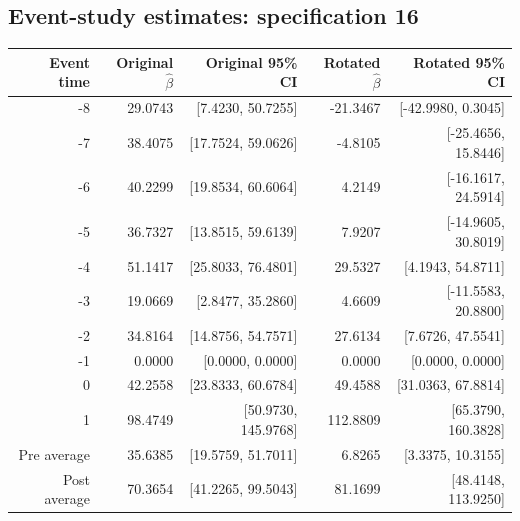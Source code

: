\documentclass[10pt]{article}
\begin{document}
\subsection*{Event-study estimates: specification 16}
\begin{center}\scriptsize
\begin{tabular}{r rr rr}
\toprule
Event time & Original $\hat\beta$ & Original 95\% CI & Rotated $\hat\beta$ & Rotated 95\% CI \\
\midrule
-8 & 29.0743 & [7.4230, 50.7255] & -21.3467 & [-42.9980, 0.3045] \\
-7 & 38.4075 & [17.7524, 59.0626] & -4.8105 & [-25.4656, 15.8446] \\
-6 & 40.2299 & [19.8534, 60.6064] & 4.2149 & [-16.1617, 24.5914] \\
-5 & 36.7327 & [13.8515, 59.6139] & 7.9207 & [-14.9605, 30.8019] \\
-4 & 51.1417 & [25.8033, 76.4801] & 29.5327 & [4.1943, 54.8711] \\
-3 & 19.0669 & [2.8477, 35.2860] & 4.6609 & [-11.5583, 20.8800] \\
-2 & 34.8164 & [14.8756, 54.7571] & 27.6134 & [7.6726, 47.5541] \\
-1 & 0.0000 & [0.0000, 0.0000] & 0.0000 & [0.0000, 0.0000] \\
0 & 42.2558 & [23.8333, 60.6784] & 49.4588 & [31.0363, 67.8814] \\
1 & 98.4749 & [50.9730, 145.9768] & 112.8809 & [65.3790, 160.3828] \\
\midrule
Pre average & 35.6385 & [19.5759, 51.7011] & 6.8265 & [3.3375, 10.3155] \\
Post average & 70.3654 & [41.2265, 99.5043] & 81.1699 & [48.4148, 113.9250] \\
\bottomrule
\end{tabular}
\end{center}
\clearpage
\end{document}
